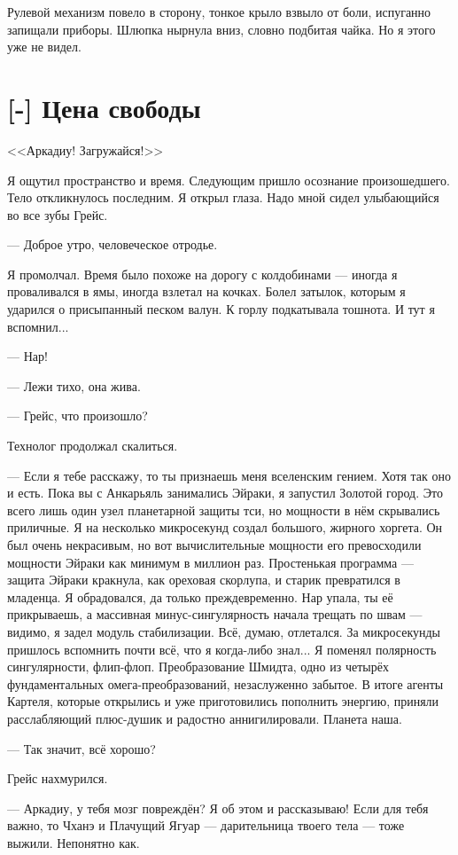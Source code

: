 Рулевой механизм повело в сторону, тонкое крыло взвыло от боли, испуганно запищали приборы.
Шлюпка нырнула вниз, словно подбитая чайка.
Но я этого уже не видел.

\section{[-] Цена свободы}

<<Аркадиу!
Загружайся!>>

Я ощутил пространство и время.
Следующим пришло осознание произошедшего.
Тело откликнулось последним.
Я открыл глаза.
Надо мной сидел улыбающийся во все зубы Грейс.

--- Доброе утро, человеческое отродье.

Я промолчал.
Время было похоже на дорогу с колдобинами --- иногда я проваливался в ямы, иногда взлетал на кочках.
Болел затылок, которым я ударился о присыпанный песком валун.
К горлу подкатывала тошнота.
И тут я вспомнил...

--- Нар!

--- Лежи тихо, она жива.

--- Грейс, что произошло?

Технолог продолжал скалиться.

--- Если я тебе расскажу, то ты признаешь меня вселенским гением.
Хотя так оно и есть.
Пока вы с Анкарьяль занимались Эйраки, я запустил Золотой город.
Это всего лишь один узел планетарной защиты тси, но мощности в нём скрывались приличные.
Я на несколько микросекунд создал большого, жирного хоргета.
Он был очень некрасивым, но вот вычислительные мощности его превосходили мощности Эйраки как минимум в миллион раз.
Простенькая программа --- защита Эйраки кракнула, как ореховая скорлупа, и старик превратился в младенца.
Я обрадовался, да только преждевременно.
Нар упала, ты её прикрываешь, а массивная минус-сингулярность начала трещать по швам --- видимо, я задел модуль стабилизации.
Всё, думаю, отлетался.
За микросекунды пришлось вспомнить почти всё, что я когда-либо знал...
Я поменял полярность сингулярности, флип-флоп.
Преобразование Шмидта, одно из четырёх фундаментальных омега-преобразований, незаслуженно забытое.
В итоге агенты Картеля, которые открылись и уже приготовились пополнить энергию, приняли расслабляющий плюс-душик и радостно аннигилировали.
Планета наша.

--- Так значит, всё хорошо?

Грейс нахмурился.

--- Аркадиу, у тебя мозг повреждён?
Я об этом и рассказываю!
Если для тебя важно, то Чханэ и Плачущий Ягуар --- дарительница твоего тела --- тоже выжили.
Непонятно как.

